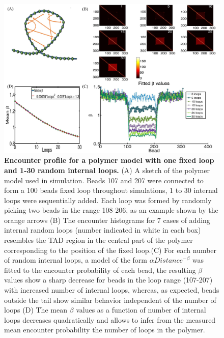 \documentclass[12pt]{article}
\begin{document}
\begin{figure}[H]
\includegraphics[scale=0.7]{Figure03_OneTADWithTails0To30RandomLoops}
\caption{\textbf{Encounter profile for a polymer model with one fixed loop and 1-30 random internal loops.} (A) A sketch of the polymer model used in simulation. Beads 107 and 207 were connected to form a 100 beads fixed loop throughout simulations, 1 to 30 internal loops were sequentially added. Each loop was formed by randomly picking two beads in the range 108-206, as an example shown by the orange arrows (B) The encounter histograms for 7 cases of adding internal random loops (number indicated in white in each box) resembles the TAD region in the central part of the polymer corresponding to the position of the fixed loop.(C) For each number of random internal loops, a model of the form $\alpha Distance^{-\beta}$ was fitted to the encounter probability of each bead, the resulting $\beta$ values show a sharp decrease for beads in the loop range (107-207) with increased number of internal loops, whereas, as expected, beads outside the tail show similar behavior independent of the number of loops (D) The mean $\beta$ values as a function of number of internal loops decreases quadratically and allows to infer from the measured mean encounter probability the number of loops in the polymer.}
\label{figure_encounterProfileOneTADWithTails}
\end{figure}
\end{document}
